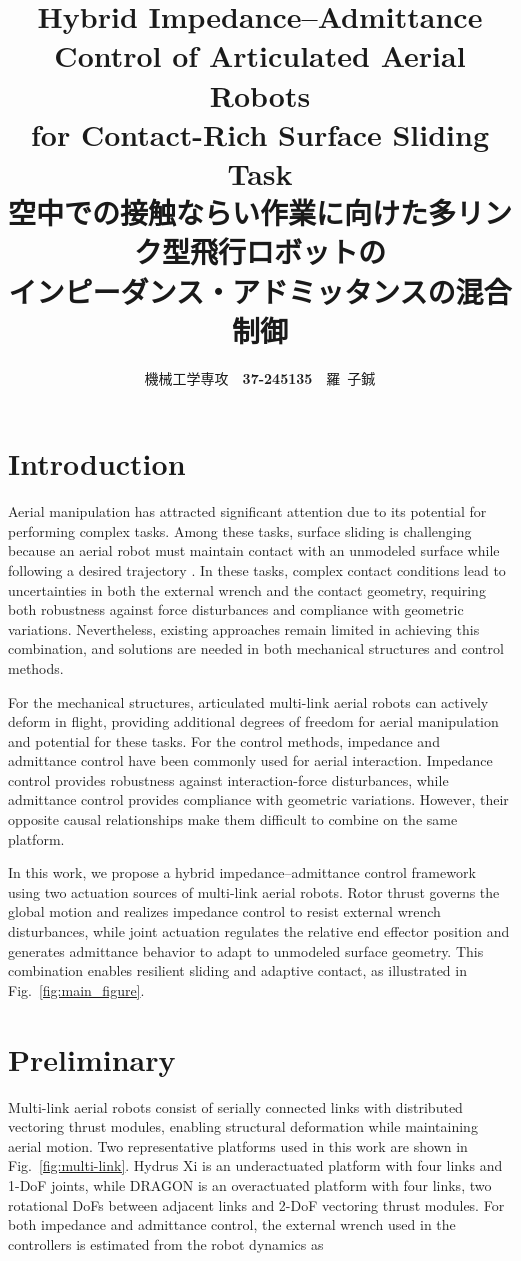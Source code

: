 \documentclass[10pt,a4paper,twocolumn]{article}
\title{\setlength{\baselineskip}{15pt}%
{\Large Hybrid Impedance--Admittance Control of Articulated Aerial Robots \\for Contact-Rich Surface Sliding Task}\\[2mm]
{\large 空中での接触ならい作業に向けた多リンク型飛行ロボットの\\インピーダンス・アドミッタンスの混合制御}
}
\author{機械工学専攻~~{\bfseries 37-245135}~~羅~子鋮}
\begin{document}
\maketitle
\thispagestyle{empty}
\normalsize

\section{Introduction}
Aerial manipulation has attracted significant attention due to its potential for performing complex tasks. Among these tasks, surface sliding is challenging because an aerial robot must maintain contact with an unmodeled surface while following a desired trajectory \cite{bodie_2020_active}. In these tasks, complex contact conditions lead to uncertainties in both the external wrench and the contact geometry, requiring both robustness against force disturbances and compliance with geometric variations. Nevertheless, existing approaches remain limited in achieving this combination, and solutions are needed in both mechanical structures and control methods.

For the mechanical structures, articulated multi-link aerial robots can actively deform in flight, providing additional degrees of freedom for aerial manipulation \cite{zhao_2021_singularity, zhao_2023_versatile} and potential for these tasks. For the control methods, impedance and admittance control have been commonly used for aerial interaction. Impedance control provides robustness against interaction-force disturbances, while admittance control provides compliance with geometric variations. However, their opposite causal relationships make them difficult to combine on the same platform.

In this work, we propose a hybrid impedance--admittance control framework using two actuation sources of multi-link aerial robots. Rotor thrust governs the global motion and realizes impedance control to resist external wrench disturbances, while joint actuation regulates the relative end effector position and generates admittance behavior to adapt to unmodeled surface geometry. This combination enables resilient sliding and adaptive contact, as illustrated in Fig.~\ref{fig:main_figure}.


\section{Preliminary}
Multi-link aerial robots consist of serially connected links with distributed vectoring thrust modules, enabling structural deformation while maintaining aerial motion. Two representative platforms used in this work are shown in Fig.~\ref{fig:multi-link}. Hydrus Xi \cite{zhao_2021_singularity} is an underactuated platform with four links and 1-DoF joints, while DRAGON \cite{zhao_2023_versatile} is an overactuated platform with four links, two rotational DoFs between adjacent links and 2-DoF vectoring thrust modules. For both impedance and admittance control, the external wrench used in the controllers is estimated from the robot dynamics as
\end{document}

